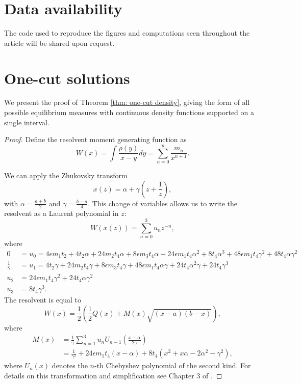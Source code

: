 \documentclass[10pt]{article}
\theoremstyle{plain}
\theoremstyle{definition}
\theoremstyle{plain}
\begin{document}
\section*{Data availability}
The code used to reproduce the figures and computations seen throughout the article will be shared upon request. 

\newpage

\appendix
\section{One-cut solutions}\label{AppA}
We present the proof of Theorem \ref{thm: one-cut density}, giving the form of all possible equilibrium measures with continuous density functions supported on a single interval.

\begin{proof}
Define the resolvent moment generating function as 
 $$W(x) = \int \frac{\rho(y)}{x-y}dy = \sum_{n=0}^{\infty}\frac{m_{n}}{x^{n+1}}.$$

 We can apply the Zhukovsky transform $$x(z) = \alpha + \gamma\left(z+\frac{1}{z}\right),$$ with $\alpha =\frac{a+b}{2}$ and $\gamma =\frac{b-a}{4}$. This change of variables allows us to write the resolvent as a Laurent polynomial in $z$: 
	\begin{equation*}
		W(x(z)) = \sum_{n=0}^{3}u_{n}z^{-n},
	\end{equation*}
	where
	\begin{align*}
		0 &=u_{0}= 4 \epsilon m_1 t_2 + 4 t_2 \alpha + 24 m_2 t_4 \alpha + 
 8 \epsilon m_3 t_4 \alpha + 24 \epsilon m_1 t_4 \alpha^2 + 8 t_4 \alpha^3 + 
 48 \epsilon m_1 t_4 \gamma^2 + 48 t_4 \alpha \gamma^2\\
		\frac{1}{\gamma}&= u_{1} = 4 t_2 \gamma + 24 m_2 t_4 \gamma + 8 \epsilon m_3 t_4 \gamma + 
 48 \epsilon m_1 t_4 \alpha \gamma + 24 t_4 \alpha^2 \gamma + 
 24 t_4 \gamma^3\\
		u_2 &= 24 \epsilon m_1 t_4 \gamma^2 + 24 t_4 \alpha \gamma^2\\
		u_{3} &= 8 t_{4}\gamma^3.
	\end{align*}
	The resolvent is equal to 
	\begin{equation*}
		W(x) =\frac{1}{2}\left(\frac{1}{2}Q(x)+ M(x)\sqrt{(x-a)(b-x)} \right),
	\end{equation*}
	where 
	\begin{align*}
		M(x) &= \frac{1}{\gamma}\sum_{n=1}^{3}u_{n}U_{n-1}\left(\frac{x-\alpha}{2 \gamma}\right)\\
 &= \frac{1}{\gamma^2} + 24 \epsilon m_{1} t_{4} (x-\alpha) + 8 t_{4} (x^2 + x \alpha - 2 \alpha^2 -\gamma^2),
	\end{align*}
	where $U_{n}(x)$ denotes the $n$-th Chebyshev polynomial of the second kind. For details on this transformation and simplification see Chapter 3 of \cite{eynard2016counting}.
	

\end{proof}
\end{document}
